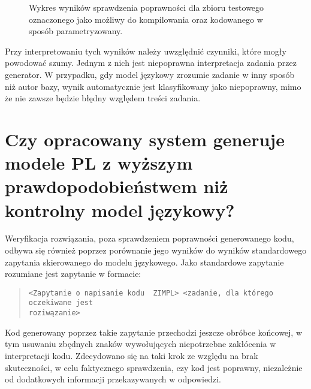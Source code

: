 \begin{figure}[H]
\centering
{}
\caption{Wykres wyników sprawdzenia poprawności dla zbioru testowego oznaczonego jako możliwy do kompilowania oraz kodowanego w sposób parametryzowany.}\label{rys:plama2i}
\end{figure}

Przy interpretowaniu tych wyników należy uwzględnić czynniki, które mogły powodować szumy. Jednym z nich jest niepoprawna interpretacja zadania przez generator. W przypadku, gdy model językowy zrozumie zadanie w inny sposób niż autor bazy, wynik automatycznie jest klasyfikowany jako niepoprawny, mimo że nie zawsze będzie błędny względem treści zadania.

\section{Czy opracowany system generuje modele PL z wyższym prawdopodobieństwem niż kontrolny model językowy?}

Weryfikacja rozwiązania, poza sprawdzeniem poprawności generowanego kodu, odbywa się również poprzez porównanie jego wyników do wyników standardowego zapytania skierowanego do modelu językowego. Jako standardowe zapytanie rozumiane jest zapytanie w formacie:

\begin{quote}
\begin{verbatim}
<Zapytanie o napisanie kodu  ZIMPL> <zadanie, dla którego oczekiwane jest
roziwązanie>
\end{verbatim}
\end{quote}

Kod generowany poprzez takie zapytanie przechodzi jeszcze obróbce końcowej, w tym usuwaniu zbędnych znaków wywołujących niepotrzebne zakłócenia w interpretacji kodu. %
Zdecydowano się na taki krok ze względu na brak skuteczności, %
w celu faktycznego sprawdzenia, czy kod jest poprawny, niezależnie od dodatkowych informacji przekazywanych w odpowiedzi.


